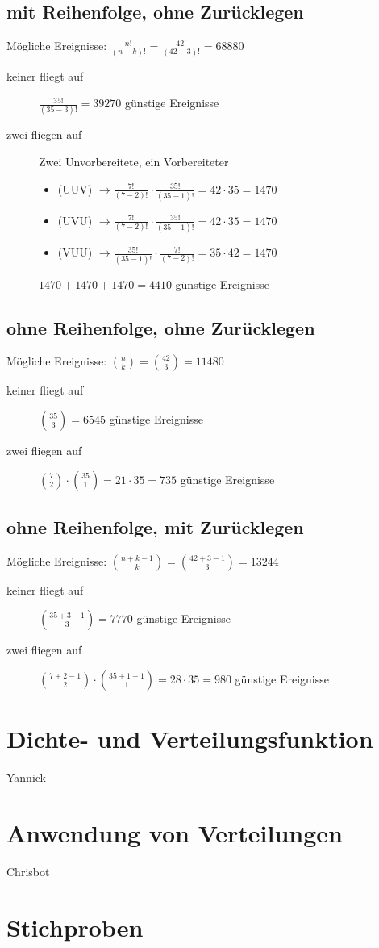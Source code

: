 \documentclass[11pt, a4paper]{article}
\begin{document}
\subsection{mit Reihenfolge, ohne Zurücklegen}
Mögliche Ereignisse: $\frac{n!}{(n-k)!} = \frac{42!}{(42-3)!} = 68880$
\begin{description}
	\item[keiner fliegt auf] $\frac{35!}{(35-3)!} = 39270$ günstige Ereignisse
	\item[zwei fliegen auf] Zwei Unvorbereitete, ein Vorbereiteter
		\begin{itemize}
			\item (UUV) $\rightarrow \frac{7!}{(7-2)!} \cdot \frac{35!}{(35-1)!} = 42 \cdot 35 = 1470$
			\item (UVU) $\rightarrow \frac{7!}{(7-2)!} \cdot \frac{35!}{(35-1)!} = 42 \cdot 35 = 1470$
			\item (VUU) $\rightarrow \frac{35!}{(35-1)!} \cdot \frac{7!}{(7-2)!} = 35 \cdot 42 = 1470$
		\end{itemize}
		$1470 + 1470 + 1470 = 4410$ günstige Ereignisse
\end{description}

\subsection{ohne Reihenfolge, ohne Zurücklegen}
Mögliche Ereignisse: $\binom{n}{k} = \binom{42}{3} = 11480$
\begin{description}
	\item[keiner fliegt auf] $\binom{35}{3} = 6545$  günstige Ereignisse
	\item[zwei fliegen auf] $\binom{7}{2} \cdot \binom{35}{1} = 21 \cdot 35 = 735$  günstige Ereignisse
\end{description}

\subsection{ohne Reihenfolge, mit Zurücklegen}
Mögliche Ereignisse: $\binom{n+k-1}{k} = \binom{42+3-1}{3} = 13244$
\begin{description}
	\item[keiner fliegt auf] $\binom{35+3-1}{3} = 7770$ günstige Ereignisse
	\item[zwei fliegen auf] $\binom{7+2-1}{2} \cdot \binom{35+1-1}{1} = 28 \cdot 35 = 980$ günstige Ereignisse
\end{description}

\section{Dichte- und Verteilungsfunktion}
Yannick

\section{Anwendung von Verteilungen}
Chrisbot

\section{Stichproben}
\end{document}
